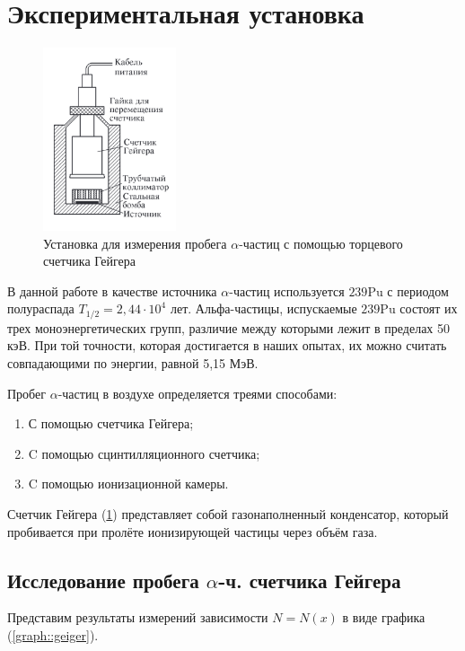 \documentclass[a4paper,12pt]{article} %
\begin{document}
\section{Экспериментальная установка}

\begin{figure}
    \centering
    \includegraphics[width=0.35\textwidth]{Gayger.png}
    \caption{Установка для измерения пробега $\alpha$-частиц с помощью торцевого счетчика Гейгера}
    \label{fig:Geyger}
\end{figure}

В данной работе в качестве источника $\alpha$-частиц используется ${239}$Pu с периодом полураспада $T_{1/2} = 2,44 \cdot 10^4$ лет. Альфа-частицы, испускаемые ${239}$Pu состоят их трех моноэнергетических групп, различие между которыми лежит в пределах 50 кэВ. При той точности, которая достигается в наших опытах, их можно считать совпадающими по энергии, равной 5,15 МэВ.

Пробег $\alpha$-частиц в воздухе определяется треями способами:
	\begin{enumerate}
		\item
			С помощью счетчика Гейгера;
		\item
			C помощью сцинтилляционного счетчика;
		\item
			C помощью ионизационной камеры.
	\end{enumerate}
	
Счетчик Гейгера (\ref{fig:Geyger}) представляет собой газонаполненный конденсатор, который пробивается при пролёте ионизирующей частицы через объём газа.

\subsection{Исследование пробега $\alpha$-ч. счетчика Гейгера}	
Представим результаты измерений зависимости $N=N(x)$ в виде графика (\ref{graph::geiger}). 
\end{document}
